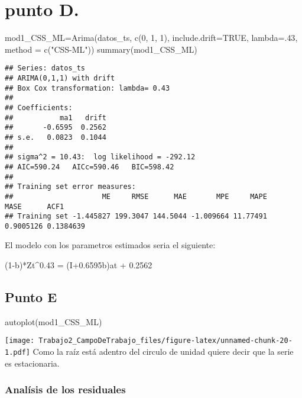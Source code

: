 \documentclass[
]{article}
\newenvironment{Shaded}{\begin{snugshade}}{\end{snugshade}}
\newcommand{\AttributeTok}[1]{\textcolor[rgb]{0.77,0.63,0.00}{#1}}
\newcommand{\ConstantTok}[1]{\textcolor[rgb]{0.00,0.00,0.00}{#1}}
\newcommand{\DecValTok}[1]{\textcolor[rgb]{0.00,0.00,0.81}{#1}}
\newcommand{\FunctionTok}[1]{\textcolor[rgb]{0.00,0.00,0.00}{#1}}
\newcommand{\NormalTok}[1]{#1}
\newcommand{\OtherTok}[1]{\textcolor[rgb]{0.56,0.35,0.01}{#1}}
\newcommand{\StringTok}[1]{\textcolor[rgb]{0.31,0.60,0.02}{#1}}
\begin{document}
\hypertarget{punto-d.}{%
\section{punto D.}\label{punto-d.}}

\begin{Shaded}
\begin{Highlighting}[]
\NormalTok{mod1\_CSS\_ML}\OtherTok{=}\FunctionTok{Arima}\NormalTok{(datos\_ts, }\FunctionTok{c}\NormalTok{(}\DecValTok{0}\NormalTok{, }\DecValTok{1}\NormalTok{, }\DecValTok{1}\NormalTok{), }\AttributeTok{include.drift=}\ConstantTok{TRUE}\NormalTok{, }\AttributeTok{lambda=}\NormalTok{.}\DecValTok{43}\NormalTok{, }\AttributeTok{method =} \FunctionTok{c}\NormalTok{(}\StringTok{"CSS{-}ML"}\NormalTok{))}
\FunctionTok{summary}\NormalTok{(mod1\_CSS\_ML)}
\end{Highlighting}
\end{Shaded}

\begin{verbatim}
## Series: datos_ts 
## ARIMA(0,1,1) with drift 
## Box Cox transformation: lambda= 0.43 
## 
## Coefficients:
##           ma1   drift
##       -0.6595  0.2562
## s.e.   0.0823  0.1044
## 
## sigma^2 = 10.43:  log likelihood = -292.12
## AIC=590.24   AICc=590.46   BIC=598.42
## 
## Training set error measures:
##                     ME     RMSE      MAE       MPE     MAPE      MASE      ACF1
## Training set -1.445827 199.3047 144.5044 -1.009664 11.77491 0.9005126 0.1384639
\end{verbatim}

El modelo con los parametros estimados seria el siguiente:

(1-b)*Zt\^{}0.43 = (I+0.6595b)at + 0.2562

\hypertarget{punto-e}{%
\subsection{Punto E}\label{punto-e}}

\begin{Shaded}
\begin{Highlighting}[]
\FunctionTok{autoplot}\NormalTok{(mod1\_CSS\_ML)}
\end{Highlighting}
\end{Shaded}

\texttt{[image: Trabajo2\_CampoDeTrabajo\_files/figure-latex/unnamed-chunk-20-1.pdf]}
Como la raíz está adentro del circulo de unidad quiere decir que la
serie es estacionaria.

\hypertarget{analuxedsis-de-los-residuales}{%
\subsubsection{Analísis de los
residuales}\label{analuxedsis-de-los-residuales}}
\end{document}
